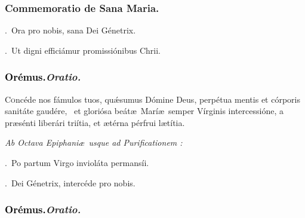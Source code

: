 \documentclass[12pt]{article} %
\newenvironment{rubric}{\vspace{2 mm}\color{benred8} \itshape \leftskip 0in \setlength{\parindent}{0.25in}}{\vspace{2 mm}}
\newenvironment{response}{\leftskip 0in \setlength{\parindent}{0in}}{\vspace{2 mm}}
\let\oldgresixstar\gresixstar
\renewcommand{\gresixstar}{\textcolor{benred8}{\oldgresixstar}}
\let\oldVbar\Vbar
\renewcommand{\Vbar}{\textcolor{benred8}{\oldVbar .}}
\let\oldRbar\Rbar
\renewcommand{\Rbar}{\textcolor{benred8}{\oldRbar .}}
\def\capitulumSpace{\hspace{20 mm}}
\begin{document}

\subsubsection*{Commemoratio de Sana Maria.}


\gresetfirstlineaboveinitial{\small \textsc{ \textbf{\textcolor{benred8}{I}}}}{\small \textsc{ \textbf{\textcolor{benred8}{I}}}}

\begin{response}
\Vbar\ Ora pro nobis, sana Dei G\'{e}netrix.

\Rbar\ Ut digni effici\'{a}mur promissi\'{o}nibus Chrii.

\end{response}

\subsubsection*{\textcolor{black}{Or\'{e}mus.}\capitulumSpace \emph{Oratio.}}

\begin{response}\lettrine{C}{o}nc\'{e}de nos f\'{a}mulos tuos, qu\'{\ae}sumus D\'{o}mine Deus, perp\'{e}tua mentis et c\'{o}rporis sanit\'{a}te gaud\'{e}re, \gresixstar\ et glori\'{o}sa be\'{a}t\ae\ Mar\'{i}\ae\ semper V\'{i}rginis intercessi\'{o}ne, a pr\ae s\'{e}nti liber\'{a}ri tri\'{i}tia, et \ae t\'{e}rna p\'{e}rfrui l\ae t\'{i}tia.

\end{response}

\begin{rubric}
Ab Octava Epiphani\ae\ usque ad Purificationem :

\end{rubric}

\begin{response}
\Vbar\ Po partum Virgo inviol\'{a}ta permans\'{i}i.

\Rbar\ Dei G\'{e}netrix, interc\'{e}de pro nobis.

\end{response}

\subsubsection*{\textcolor{black}{Or\'{e}mus.}\capitulumSpace \emph{Oratio.}}
\end{document}
